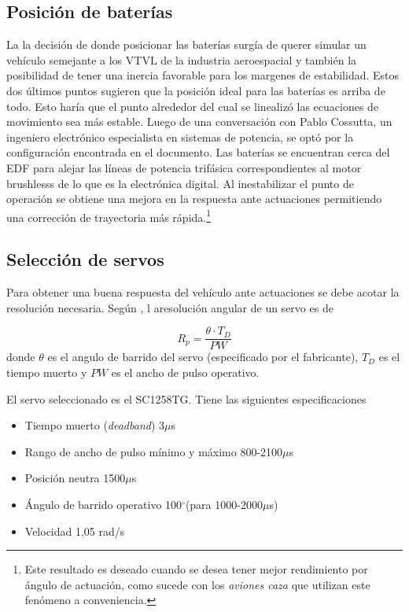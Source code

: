 \subsection{Posición de baterías}

La la decisión de donde posicionar las baterías surgía de querer simular un vehículo semejante a los VTVL de la industria aeroespacial y también la posibilidad de tener una inercia favorable para los margenes de estabilidad. Estos dos últimos puntos sugieren que la posición ideal para las baterías es arriba de todo. Esto haría que el punto alrededor del cual se linealizó las ecuaciones de movimiento sea más estable. Luego de una conversación con Pablo Cossutta, un ingeniero electrónico especialista en sistemas de potencia, se optó por la configuración encontrada en el documento. Las baterías se encuentran cerca del EDF para alejar las líneas de potencia trifásica correspondientes al motor brushlesss de lo que es la electrónica digital. Al inestabilizar el punto de operación se obtiene una mejora en la respuesta ante actuaciones permitiendo una corrección de trayectoria más rápida.\footnote{Este resultado es deseado cuando se desea tener mejor rendimiento por ángulo de actuación, como sucede con los \textit{aviones caza} que utilizan este fenómeno a conveniencia.}


\subsection{Selección de servos} \label{ssec:servoSeleccion}
\newcommand{\micro}{\ensuremath{\mu}}
\newcommand{\grad}{\ensuremath{^\circ}}
Para obtener una buena respuesta del vehículo ante actuaciones se debe acotar la resolución necesaria. Según \cite{castillo2018efectos}, l aresolución angular de un servo es de 


\[
R_p = \frac{\theta \cdot T_D}{PW}  
\]
donde $\theta$ es el angulo de barrido del servo (especificado por el fabricante), $T_D$ es el tiempo muerto y $PW$ es el ancho de pulso operativo. 

El servo seleccionado es el SC1258TG. Tiene las siguientes especificaciones

\begin{itemize}
    \item Tiempo muerto (\textit{deadband}) 3\micro s
    \item Rango de ancho de pulso mínimo y máximo 800-2100\micro s
    \item Posición neutra 1500\micro s
    \item Ángulo de barrido operativo 100\grad (para 1000-2000\micro s)
    \item Velocidad 1,05 rad/s
\end{itemize}

